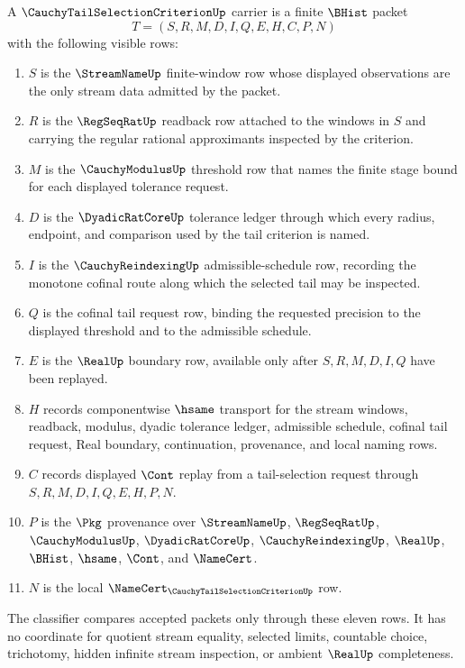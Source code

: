 \begin{definition}
\label{def:cauchy-tail-selection-criterion-carrier}
A $\CauchyTailSelectionCriterionUp$ carrier is a finite $\BHist$ packet
$$
T=(S,R,M,D,I,Q,E,H,C,P,N)
$$
with the following visible rows:
\begin{enumerate}
\item $S$ is the $\StreamNameUp$ finite-window row whose displayed observations are the only stream data admitted by the packet.
\item $R$ is the $\RegSeqRatUp$ readback row attached to the windows in $S$ and carrying the regular rational approximants inspected by the criterion.
\item $M$ is the $\CauchyModulusUp$ threshold row that names the finite stage bound for each displayed tolerance request.
\item $D$ is the $\DyadicRatCoreUp$ tolerance ledger through which every radius, endpoint, and comparison used by the tail criterion is named.
\item $I$ is the $\CauchyReindexingUp$ admissible-schedule row, recording the monotone cofinal route along which the selected tail may be inspected.
\item $Q$ is the cofinal tail request row, binding the requested precision to the displayed threshold and to the admissible schedule.
\item $E$ is the $\RealUp$ boundary row, available only after $S,R,M,D,I,Q$ have been replayed.
\item $H$ records componentwise $\hsame$ transport for the stream windows, readback, modulus, dyadic tolerance ledger, admissible schedule, cofinal tail request, Real boundary, continuation, provenance, and local naming rows.
\item $C$ records displayed $\Cont$ replay from a tail-selection request through $S,R,M,D,I,Q,E,H,P,N$.
\item $P$ is the $\Pkg$ provenance over $\StreamNameUp$, $\RegSeqRatUp$, $\CauchyModulusUp$, $\DyadicRatCoreUp$, $\CauchyReindexingUp$, $\RealUp$, $\BHist$, $\hsame$, $\Cont$, and $\NameCert$.
\item $N$ is the local $\NameCert_{\CauchyTailSelectionCriterionUp}$ row.
\end{enumerate}
The classifier compares accepted packets only through these eleven rows. It has no coordinate for quotient stream equality, selected limits, countable choice, trichotomy, hidden infinite stream inspection, or ambient $\RealUp$ completeness.
\end{definition}

